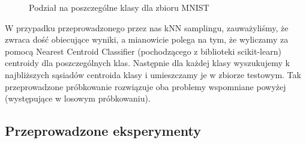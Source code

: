 \documentclass{article}
\begin{document}
\begin{figure}[h]
\hfill
{}
\hfill
{}
\hfill
\caption{Podział na poszczególne klasy dla zbioru MNIST}
\end{figure}

W przypadku przeprowadzonego przez nas kNN samplingu, zauważyliśmy, że zwraca dość obiecujące wyniki, a mianowicie polega na tym, że wyliczamy za pomocą Nearest Centroid Classifier (pochodzącego z biblioteki scikit-learn) centroidy dla poszczególnych klas. Następnie dla każdej klasy wyszukujemy k najbliższych sąsiadów centroida klasy i umieszczamy je w zbiorze testowym. Tak przeprowadzone próbkowanie rozwiązuje oba problemy wspomniane powyżej (występujące w losowym próbkowaniu).

\subsection{Przeprowadzone eksperymenty}
\end{document}
